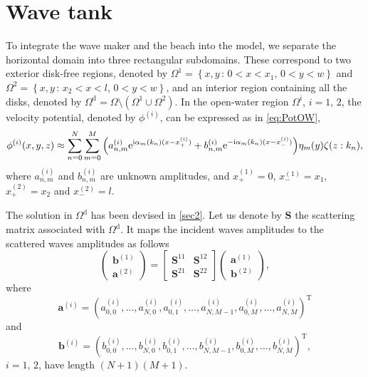\documentclass[12pt,a4paper]{article}
\newcommand{\vp}{{\phi}}
\newcommand{\vm}{{\zeta}}
\newcommand{\ym}{{\eta}}
\newcommand{\kx}{\alpha}
\begin{document}




\section{Wave tank}

To integrate the wave maker and the beach into the model, we separate the horizontal domain into three 
rectangular subdomains. These correspond to two exterior disk-free regions, denoted by $\Omega^{1} = 
\left\{x,y\,:\,0<x<x_1,\,0<y<w\right\}$ and $\Omega^{2} = \left\{x,y\,:\,x_2<x<l,\,0<y<w\right\}$, and an 
interior region containing all the disks, denoted by $\Omega^{\mathrm{d}} = \Omega \setminus 
\left(\Omega^{1} \cup \Omega^{2}\right)$. In the open-water region $\Omega^{i}$, $i=1,\,2$, the velocity 
potential, denoted by $\vp^{(i)}$, can be expressed as in \eqref{eq:PotOW}, \ie
\begin{equation}
\vp^{(i)}(x,y,z) \approx \sum_{n=0}^{N} \sum_{m=0}^{M} 
\Big(a^{(i)}_{n,m}\exp^{\ci\kx_{m}(k_{n})(x-x^{(i)}_+)} + 
b^{(i)}_{n,m}\exp^{-\ci\kx_{m}(k_{n}) (x-x^{(i)}_-)}\Big) \ym_{m}(y) \vm(z:k_{n}),
\end{equation}
where $a^{(i)}_{n,m}$ and $b^{(i)}_{n,m}$ are unknown amplitudes, and $x^{(1)}_+=0$, $x^{(1)}_-=x_1$, 
$x^{(2)}_+=x_2$ and $x^{(2)}_-=l$.

The solution in $\Omega^{\mathrm{d}}$ has been devised in \textsection \ref{sec2}. Let us denote by 
$\mathbf{S}$ the scattering matrix associated with $\Omega^{\mathrm{d}}$. It maps the incident waves 
amplitudes to the scattered waves amplitudes as follows
\begin{equation}
	\label{eq:disk_scat}
	\left(
	\begin{array}{c}
		\mathbf{b}^{(1)} \\
		\mathbf{a}^{(2)}
	\end{array}
	\right) = \left[
	\begin{array}{cc}
	\mathbf{S}^{11} & \mathbf{S}^{12} \\
	\mathbf{S}^{21} & \mathbf{S}^{22}
	\end{array}
	\right] \left(
	\begin{array}{c}
		\mathbf{a}^{(1)} \\
		\mathbf{b}^{(2)}
	\end{array}
	\right),
\end{equation}
where 
\[
	\mathbf{a}^{(i)} = \left(a^{(i)}_{0,0},\ldots,a^{(i)}_{N,0},a^{(i)}_{0,1},\ldots,a^{(i)}_{N,M-1},
	a^{(i)}_{0,M},\ldots,a^{(i)}_{N,M}\right)^{\mathrm{T}}
\]
and 
\[
	\mathbf{b}^{(i)} = \left(b^{(i)}_{0,0},\ldots,b^{(i)}_{N,0},b^{(i)}_{0,1},\ldots,b^{(i)}_{N,M-1},
	b^{(i)}_{0,M},\ldots,b^{(i)}_{N,M}\right)^{\mathrm{T}},
\]
$i=1,\,2$, have length $(N+1)(M+1)$.
\end{document}
